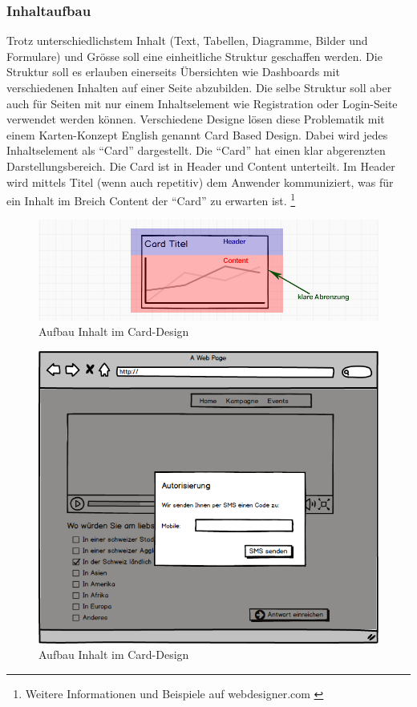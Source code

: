 \subsubsection{Inhaltaufbau}\label{inhaltaufbau}

Trotz unterschiedlichstem Inhalt (Text, Tabellen, Diagramme, Bilder und
Formulare) und Grösse soll eine einheitliche Struktur geschaffen werden.
Die Struktur soll es erlauben einerseits Übersichten wie Dashboards mit
verschiedenen Inhalten auf einer Seite abzubilden. Die selbe Struktur
soll aber auch für Seiten mit nur einem Inhaltselement wie Registration
oder Login-Seite verwendet werden können. Verschiedene Designe lösen
diese Problematik mit einem Karten-Konzept English genannt Card Based
Design. Dabei wird jedes Inhaltselement als ``Card'' dargestellt. Die
``Card'' hat einen klar abgerenzten Darstellungsbereich. Die Card ist in
Header und Content unterteilt. Im Header wird mittels Titel (wenn auch
repetitiv) dem Anwender kommuniziert, was für ein Inhalt im Breich
Content der ``Card'' zu erwarten ist. \footnote{Weitere Informationen
  und Beispiele auf webdesigner.com \autocite{card-based-design}}

\begin{figure}[htbp]
\centering
\includegraphics{images/mockups/card.jpg}
\caption{Aufbau Inhalt im Card-Design}
\end{figure}

\begin{figure}[htbp]
\centering
\includegraphics{images/mockups/Kundenimplementation-Desktop.png}
\caption{Aufbau Inhalt im Card-Design}
\end{figure}

